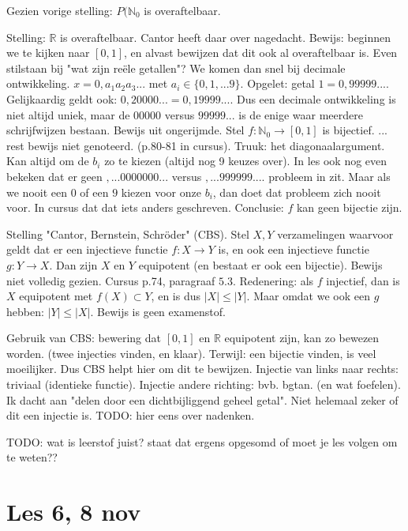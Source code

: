\documentclass{article}
\begin{document}
Gezien vorige stelling: $P(\mathbb{N}_0$ is overaftelbaar. 

Stelling: $\mathbb{R}$ is overaftelbaar. Cantor heeft daar over nagedacht. Bewijs: beginnen we te kijken naar $[ 0, 1]$, en alvast bewijzen dat dit ook al overaftelbaar is. Even stilstaan bij "wat zijn re\"ele getallen"? We komen dan snel bij decimale ontwikkeling. $x = 0,a_1 a_2 a_3 ...$ met $a_i \in \{ 0,1,...9\}$. Opgelet: getal $1 = 0,99999...$. Gelijkaardig geldt ook: $0,20000... = 0,19999...$. Dus een decimale ontwikkeling is niet altijd uniek, maar de $00000$ versus $99999...$ is de enige waar meerdere schrijfwijzen bestaan. 
Bewijs uit ongerijmde. Stel $f: \mathbb{N}_0 \rightarrow [ 0,1] $ is bijectief. ... rest bewijs niet genoteerd. (p.80-81 in cursus). Truuk: het diagonaalargument. Kan altijd om de $b_i$ zo te kiezen (altijd nog 9 keuzes over). 
In les ook nog even bekeken dat er geen $,...0000000...$ versus $,...999999....$ probleem in zit. Maar als we nooit een $0$ of een $9$ kiezen voor onze $b_i$, dan doet dat probleem zich nooit voor. In cursus dat dat iets anders geschreven. 
Conclusie: $f$ kan geen bijectie zijn. 


Stelling "Cantor, Bernstein, Schr\"oder" (CBS). Stel $X,Y$ verzamelingen waarvoor geldt dat er een injectieve functie $f: X \rightarrow Y$ is, en ook een injectieve functie $g: Y \rightarrow X$. Dan zijn $X$ en $Y$ equipotent (en bestaat er ook een bijectie). Bewijs niet volledig gezien. Cursus p.74, paragraaf $5.3$. 
Redenering: als $f$ injectief, dan is $X$ equipotent met $f(X) \subset Y$, en is dus $|X| \leq |Y|$. Maar omdat we ook een $g$ hebben: $|Y| \leq |X|$. 
Bewijs is geen examenstof. 

Gebruik van CBS: bewering dat $[ 0,1 ]$ en $\mathbb{R}$ equipotent zijn, kan zo bewezen worden. (twee injecties vinden, en klaar). Terwijl: een bijectie vinden, is veel moeilijker. Dus CBS helpt hier om dit te bewijzen. Injectie van links naar rechts: triviaal (identieke functie). Injectie andere richting: bvb. bgtan. (en wat foefelen). Ik dacht aan "delen door een dichtbijliggend geheel getal". Niet helemaal zeker of dit een injectie is. TODO: hier eens over nadenken.  

TODO: wat is leerstof juist? staat dat ergens opgesomd of moet je les volgen om te weten?? 


\section{Les 6, 8 nov}
\end{document}
